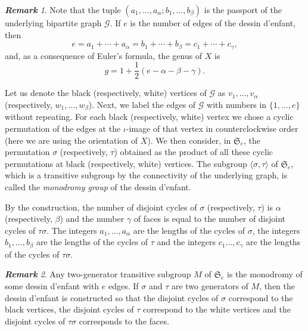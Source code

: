 \documentclass[12pt]{amsart}
\theoremstyle{remark}
\newtheorem{rema}{\bf Remark}
\begin{document}
{\vspace{0.3cm}}
\noindent
\begin{rema}
Note that the tuple $(a_{1},\ldots,a_{\alpha};b_{1},\ldots,b_{\beta})$ is the passport of the underlying bipartite graph ${\mathcal G}$.
If $e$ is the number of edges of the dessin d'enfant, then 
$$e=a_{1}+\cdots+a_{\alpha}=b_{1}+\cdots+b_{\beta}=c_{1}+\cdots+c_{\gamma},$$
and, as a consequence of Euler's formula, the genus of $X$ is
$$g=1+\frac{1}{2} \left( e-\alpha-\beta-\gamma\right).$$

\end{rema}

{\vspace{0.3cm}}

Let us denote the black (respectively, white) vertices of ${\mathcal G}$ as $v_{1},\ldots,v_{\alpha}$ (respectively, $w_{1},\ldots,w_{\beta}$).  Next, we label the edges of ${\mathcal G}$ with numbers in $\{1,\ldots,e\}$ without repeating. For each black (respectively, white) vertex we chose a cyclic permutation of the edges at the $\iota$-image of that vertex in counterclockwise order (here we are using the orientation of $X$). We then consider, in ${\mathfrak S}_{e}$, the permutation $\sigma$ (respectively, $\tau$) obtained as the product of all these cyclic permutations at black (respectively, white) vertices. The subgroup $\langle \sigma, \tau\rangle$ of ${\mathfrak S}_{e}$, which is a transitive subgroup by the connectivity of the underlying graph, is called the {\it monodromy group} of the dessin d'enfant. 

By the construction, the number of disjoint cycles of $\sigma$ (respectively, $\tau$) is $\alpha$ (respectively, $\beta$) and the number $\gamma$ of faces is equal to the number of disjoint cycles of $\tau\sigma$. 
The integers $a_{1}, \ldots, a_{\alpha}$ are the lengths of the cycles of $\sigma$, the integers 
$b_{1}, \ldots, b_{\beta}$ are the lengths of the cycles of $\tau$ and the integers
$c_{1} \ldots, c_{\gamma}$ are the lengths of the cycles of $\tau\sigma$.

{\vspace{0.3cm}}
\noindent
\begin{rema}
Any two-generator transitive subgroup $M$ of ${\mathfrak S}_{e}$ is the monodromy of some dessin d'enfant with $e$ edges. If $\sigma$ and $\tau$ are two generators of $M$, then the dessin d'enfant is constructed so that 
the disjoint cycles of $\sigma$ correspond to the black vertices, the disjoint cycles of $\tau$ correspond to the white vertices and the disjoint cycles of $\tau\sigma$ corresponds to the faces.
\end{rema}
\end{document}
